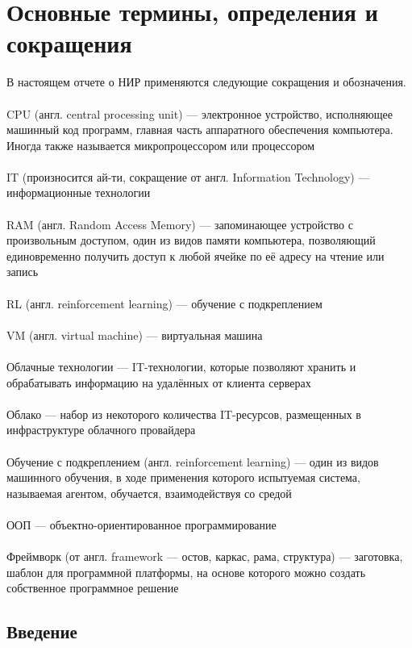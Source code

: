 \documentclass{article}
\begin{document}
\section {Основные термины, определения и сокращения}
В настоящем отчете о НИР применяются следующие сокращения и обозначения.\\
~\\
CPU (англ. central processing unit) — электронное устройство, исполняющее машинный код программ, главная часть аппаратного обеспечения компьютера. Иногда также называется микропроцессором или процессором\\
~\\
IT (произносится ай-ти, сокращение от англ. Information Technology) — информационные технологии\\
~\\
RAM (англ. Random Access Memory) — запоминающее устройство с произвольным доступом, один из видов памяти компьютера, позволяющий единовременно получить доступ к любой ячейке по её адресу на чтение или запись\\
~\\
RL (англ. reinforcement learning) — обучение с подкреплением\\
~\\
VM (англ. virtual machine) — виртуальная машина\\
~\\
Облачные технологии — IT-технологии, которые позволяют хранить и обрабатывать информацию на удалённых от клиента серверах\\
~\\
Облако — набор из некоторого количества IT-ресурсов, размещенных в инфраструктуре облачного провайдера\\
~\\
Обучение с подкреплением (англ. reinforcement learning) — один из видов машинного обучения, в ходе применения которого испытуемая система, называемая агентом, обучается, взаимодействуя со средой\\
~\\
ООП — объектно-ориентированное программирование\\
~\\
Фреймворк (от англ. framework — остов, каркас, рама, структура) — заготовка, шаблон для программной платформы, на основе которого можно создать собственное программное решение\\
\newpage
\begin{center}
\section {Введение}
\end{center}
\end{document}
